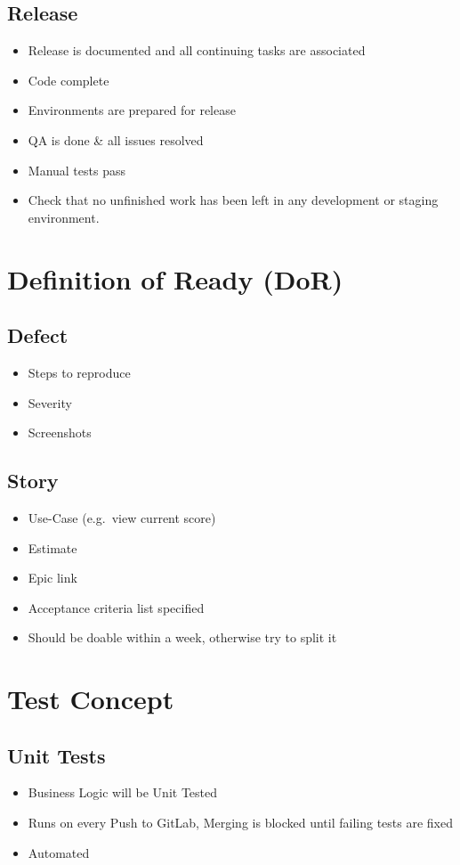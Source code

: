 \subsection{Release}
\begin{itemize}
    \item Release is documented and all continuing tasks are associated
    \item Code complete
    \item Environments are prepared for release
    \item QA is done \& all issues resolved
    \item Manual tests pass
    \item Check that no unfinished work has been left in any development or staging environment.
\end{itemize}

\section{Definition of Ready (DoR)}

\subsection{Defect}
\begin{itemize}
    \item Steps to reproduce
    \item Severity
    \item Screenshots
\end{itemize}

\subsection{Story}
\begin{itemize}
    \item Use-Case (e.g.\ view current score)
    \item Estimate
    \item Epic link
    \item Acceptance criteria list specified
    \item Should be doable within a week, otherwise try to split it
\end{itemize}

\section{Test Concept}
\subsection{Unit Tests}
\begin{itemize}
    \item Business Logic will be Unit Tested
    \item Runs on every Push to GitLab, Merging is blocked until failing tests are fixed
    \item Automated
\end{itemize}


